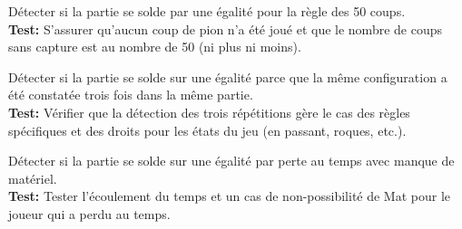 \documentclass{article}
\begin{document}
\begin{needbox}
\begin{subneedbox}
    \end{subneedbox}
    \begin{subneedbox}
        Détecter si la partie se solde par une égalité pour la règle des 50 coups.\\
        \textbf{Test:} S'assurer qu'aucun coup de pion n'a été joué et que le nombre de coups sans capture est au nombre de 50
        (ni plus ni moins).
    \end{subneedbox}
    \begin{subneedbox}
        Détecter si la partie se solde sur une égalité parce que la même configuration a été constatée trois fois dans la même partie.\\
        \textbf{Test:} Vérifier que la détection des trois répétitions gère le cas des règles spécifiques et des droits pour
        les états du jeu (en passant, roques, etc.).
    \end{subneedbox}
    \begin{subneedbox}
        Détecter si la partie se solde sur une égalité par perte au temps avec manque de matériel.\\
        \textbf{Test:} Tester l'écoulement du temps et un cas de non-possibilité de Mat pour le joueur qui a perdu au temps.
    \end{subneedbox}
\end{needbox}
\end{document}
